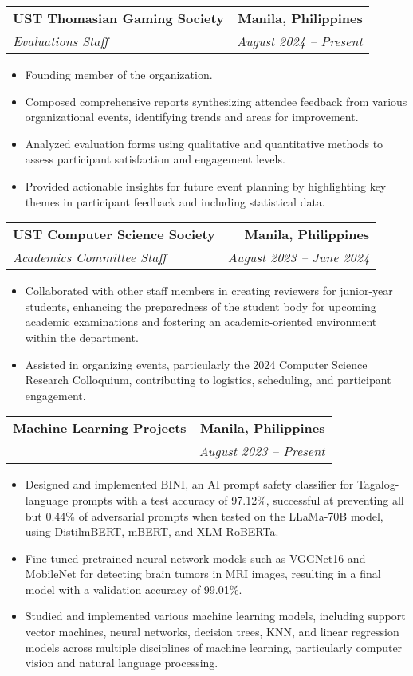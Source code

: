 \documentclass[letterpaper,11pt]{article}
\makeatletter
\newcommand{\resumeItem}[1]{
  \item\small{
    {#1 \vspace{-2pt}}
  }
}
\newcommand{\resumeSubheading}[4]{
  \vspace{-2pt}\item
    \begin{tabular*}{1.0\textwidth}[t]{l@{\extracolsep{\fill}}r}
      \textbf{#1} & \textbf{\small #2} \\
      \textit{\small#3} & \textit{\small #4} \\
    \end{tabular*}\vspace{-7pt}
}
\newcommand{\resumeItemListStart}{\begin{itemize}}
\newcommand{\resumeItemListEnd}{\end{itemize}\vspace{-5pt}}
\makeatother
\begin{document}
    \resumeSubheading
      {UST Thomasian Gaming Society}{Manila, Philippines}
      {Evaluations Staff}{August 2024 -- Present}
      \resumeItemListStart
        \resumeItem{Founding member of the organization.}
        \resumeItem{Composed comprehensive reports synthesizing attendee feedback from various organizational events, identifying trends and areas for improvement.}
        \resumeItem{Analyzed evaluation forms using qualitative and quantitative methods to assess participant satisfaction and engagement levels.}
        \resumeItem{Provided actionable insights for future event planning by highlighting key themes in participant feedback and including statistical data.}
      \resumeItemListEnd

    \resumeSubheading
      {UST Computer Science Society}{Manila, Philippines}
      {Academics Committee Staff}{August 2023 -- June 2024}
      \resumeItemListStart
        \resumeItem{Collaborated with other staff members in creating reviewers for junior-year students, enhancing the preparedness of the student body for upcoming academic examinations and fostering an academic-oriented environment within the department.}
        \resumeItem{Assisted in organizing events, particularly the 2024 Computer Science Research Colloquium, contributing to logistics, scheduling, and participant engagement.}
      \resumeItemListEnd

    \resumeSubheading
      {Machine Learning Projects}{Manila, Philippines}
      {}{August 2023 -- Present}
      \resumeItemListStart
        \resumeItem{Designed and implemented BINI, an AI prompt safety classifier for Tagalog-language prompts with a test accuracy of 97.12\%, successful at preventing all but 0.44\% of adversarial prompts when tested on the LLaMa-70B model, using DistilmBERT, mBERT, and XLM-RoBERTa.}
        \resumeItem{Fine-tuned pretrained neural network models such as VGGNet16 and MobileNet for detecting brain tumors in MRI images, resulting in a final model with a validation accuracy of 99.01\%.}
        \resumeItem{Studied and implemented various machine learning models, including support vector machines, neural networks, decision trees, KNN, and linear regression models across multiple disciplines of machine learning, particularly computer vision and natural language processing.}
      \resumeItemListEnd
\end{document}
